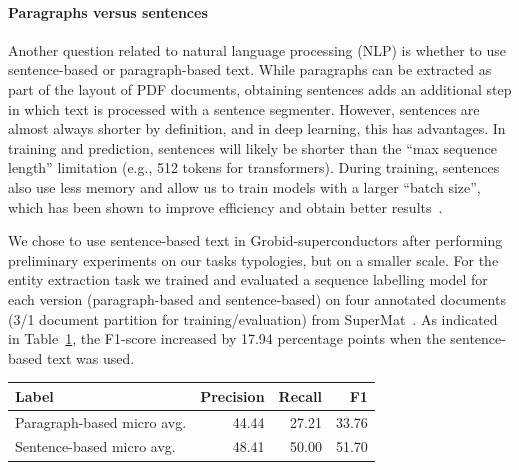 \documentclass[]{interact}
\theoremstyle{plain}%
\theoremstyle{definition}
\theoremstyle{remark}
\begin{document}
\paragraph*{Paragraphs versus sentences}
Another question related to natural language processing (NLP) is whether to use sentence-based or paragraph-based text.
While paragraphs can be extracted as part of the layout of PDF documents, obtaining sentences adds an additional step in which text is processed with a sentence segmenter.
However, sentences are almost always shorter by definition, and in deep learning, this has advantages.
In training and prediction, sentences will likely be shorter than the ``max sequence length'' limitation (e.g., 512 tokens for transformers).
During training, sentences also use less memory and allow us to train models with a larger ``batch size'', which has been shown to improve efficiency and obtain better results~\cite{roberta}. 

We chose to use sentence-based text in Grobid-superconductors after performing preliminary experiments on our tasks typologies, but on a smaller scale. 
For the entity extraction task we trained and evaluated a sequence labelling model for each version (paragraph-based and sentence-based) on four annotated documents (3/1 document partition for training/evaluation) from SuperMat~\cite{foppiano2021supermat}.
As indicated in Table~\ref{tab:comparison-evaluation-sentences-paragraphs}, the F1-score increased by 17.94 percentage points when the sentence-based text was used.

\begin{table}[ht]
    \centering
    {
        \begin{tabular}{lrrr}
            \toprule
            \textbf{Label}             & \textbf{Precision} & \textbf{Recall} & \textbf{F1} \\
            \midrule
            Paragraph-based micro avg. & 44.44              & 27.21           & 33.76       \\
            Sentence-based micro avg.  & 48.41              & 50.00           & 51.70       \\
            \bottomrule
        \end{tabular}
    }
    \label{tab:comparison-evaluation-sentences-paragraphs}
\end{table}
\end{document}
